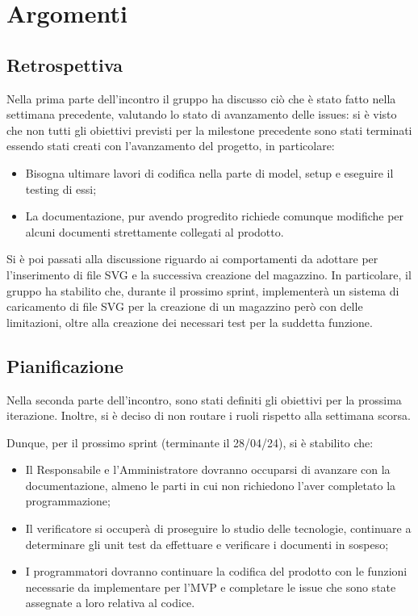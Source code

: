 \section{Argomenti}
\subsection{Retrospettiva}
Nella prima parte dell'incontro il gruppo ha discusso ciò che è stato fatto nella settimana precedente, valutando lo stato di avanzamento delle issues: si è visto che non tutti gli obiettivi previsti per la milestone precedente sono stati terminati essendo stati creati con l'avanzamento del progetto, in particolare:
\begin{itemize}
    \item Bisogna ultimare lavori di codifica nella parte di model, setup e eseguire il testing di essi;
    \item La documentazione, pur avendo progredito richiede comunque modifiche per alcuni documenti strettamente collegati al prodotto.
\end{itemize}
Si è poi passati alla discussione riguardo ai comportamenti da adottare per l'inserimento di file SVG e la successiva creazione del magazzino.
In particolare, il gruppo ha stabilito che, durante il prossimo sprint, implementerà un sistema di caricamento di file SVG per la creazione di un magazzino però con delle limitazioni, oltre alla creazione dei necessari test per la suddetta funzione.

\subsection{Pianificazione}
Nella seconda parte dell'incontro, sono stati definiti gli obiettivi per la prossima iterazione. Inoltre, si è deciso di non routare i ruoli rispetto alla settimana scorsa.
\bigskip

\noindent Dunque, per il prossimo sprint (terminante il 28/04/24), si è stabilito che:
\begin{itemize}
    \item Il Responsabile e l'Amministratore dovranno occuparsi di avanzare con la documentazione, almeno le parti in cui non richiedono l'aver completato la programmazione;
    \item Il verificatore si occuperà di proseguire lo studio delle tecnologie, continuare a determinare gli unit test da effettuare e verificare i documenti in sospeso;
    \item I programmatori dovranno continuare la codifica del prodotto con le funzioni necessarie da implementare per l'MVP e completare le issue che sono state assegnate a loro relativa al codice.
\end{itemize}


